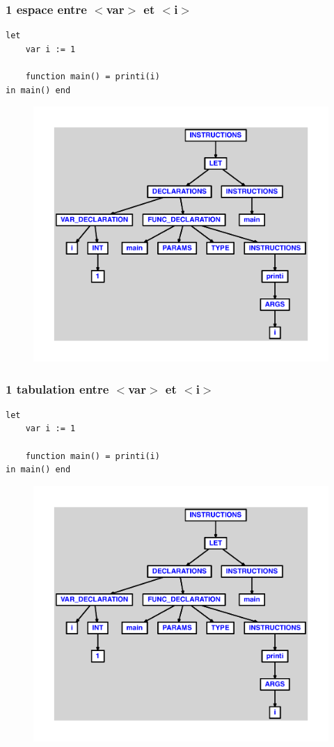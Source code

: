 \documentclass{article}
\begin{document}
\subsubsection{1 espace entre $ < $var$ > $ et $ < $i$ > $}
\begin{lstlisting}
let
	var i := 1

	function main() = printi(i)
in main() end
\end{lstlisting}
\newpage
\begin{figure}[H]
\centering
\includegraphics[max width=\textwidth]{ast/ast_183.pdf}
\end{figure}
\newpage
\subsubsection{1 tabulation entre $ < $var$ > $ et $ < $i$ > $}
\begin{lstlisting}
let
	var	i := 1

	function main() = printi(i)
in main() end
\end{lstlisting}
\newpage
\begin{figure}[H]
\centering
\includegraphics[max width=\textwidth]{ast/ast_184.pdf}
\end{figure}
\newpage
\end{document}
